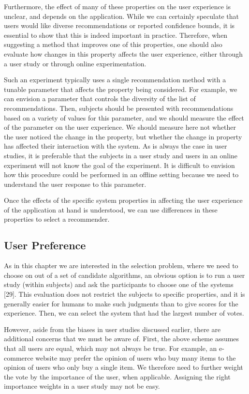 Furthermore, the effect of many of these properties on the user experience is unclear, and depends on the application. While we can certainly speculate that users would like diverse recommendations or reported confidence bounds, it is essential to show that this is indeed important in practice. Therefore, when suggesting a method that improves one of this properties, one should also evaluate how changes in this property affects the user experience, either through a user study or through online experimentation.

Such an experiment typically uses a single recommendation method with a tunable parameter that affects the property being considered. For example, we can envision a parameter that controls the diversity of the list of recommendations. Then, subjects should be presented with recommendations based on a variety of values for this parameter, and we should measure the effect of the parameter on the user experience. We should measure here not whether the user noticed the change in the property, but whether the change in property has affected their interaction with the system. As is always the case in user studies, it is preferable that the subjects in a user study and users in an online experiment will not know the goal of the experiment. It is difficult to envision how this procedure could be performed in an offline setting because we need to understand the user response to this parameter.

Once the effects of the specific system properties in affecting the user experience of the application at hand is understood, we can use differences in these properties to select a recommender.


\subsection{User Preference}

As in this chapter we are interested in the selection problem, where we need to choose on out of a set of candidate algorithms, an obvious option is to run a user study (within subjects) and ask the participants to choose one of the systems [29]. This evaluation does not restrict the subjects to specific properties, and it is generally easier for humans to make such judgments than to give scores for the experience. Then, we can select the system that had the largest number of votes.

However, aside from the biases in user studies discussed earlier, there are additional concerns that we must be aware of. First, the above scheme assumes that all users are equal, which may not always be true. For example, an e-commerce website may prefer the opinion of users who buy many items to the opinion of users who only buy a single item. We therefore need to further weight the vote by the importance of the user, when applicable. Assigning the right importance weights in a user study may not be easy.

